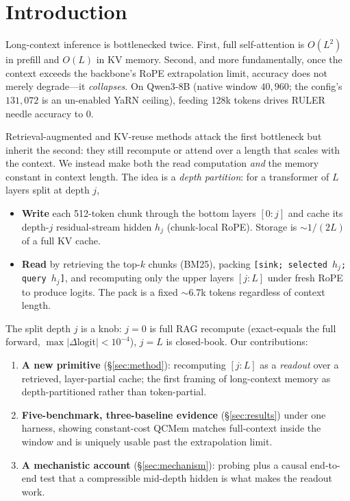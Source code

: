 \section{Introduction}
Long-context inference is bottlenecked twice. First, full self-attention is
$O(L^2)$ in prefill and $O(L)$ in KV memory. Second, and more fundamentally,
once the context exceeds the backbone's RoPE extrapolation limit, accuracy
does not merely degrade---it \emph{collapses}. On Qwen3-8B (native window
$40{,}960$; the config's $131{,}072$ is an un-enabled YaRN ceiling), feeding
128k tokens drives RULER needle accuracy to $0$.

Retrieval-augmented and KV-reuse methods attack the first bottleneck but
inherit the second: they still recompute or attend over a length that scales
with the context. We instead make both the read computation \emph{and} the
memory constant in context length. The idea is a \emph{depth partition}: for a
transformer of $L$ layers split at depth $j$,
\begin{itemize}[leftmargin=1.2em,itemsep=1pt]
\item \textbf{Write} each 512-token chunk through the bottom layers $[0{:}j]$
and cache its depth-$j$ residual-stream hidden $h_j$ (chunk-local RoPE).
Storage is $\sim$$1/(2L)$ of a full KV cache.
\item \textbf{Read} by retrieving the top-$k$ chunks (BM25), packing
\texttt{[sink; selected $h_j$; query $h_j$]}, and recomputing only the upper
layers $[j{:}L]$ under fresh RoPE to produce logits. The pack is a fixed
$\sim$6.7k tokens regardless of context length.
\end{itemize}
The split depth $j$ is a knob: $j{=}0$ is full RAG recompute (exact-equals the
full forward, $\max|\Delta\text{logit}|<10^{-4}$), $j{=}L$ is closed-book. Our
contributions:
\begin{enumerate}[leftmargin=1.4em,itemsep=1pt]
\item \textbf{A new primitive} (\S\ref{sec:method}): recomputing $[j{:}L]$ as a
\emph{readout} over a retrieved, layer-partial cache; the first framing of
long-context memory as depth-partitioned rather than token-partial.
\item \textbf{Five-benchmark, three-baseline evidence} (\S\ref{sec:results})
under one harness, showing constant-cost QCMem matches full-context inside the
window and is uniquely usable past the extrapolation limit.
\item \textbf{A mechanistic account} (\S\ref{sec:mechanism}): probing plus a
causal end-to-end test that a compressible mid-depth hidden is what makes the
readout work.
\end{enumerate}
